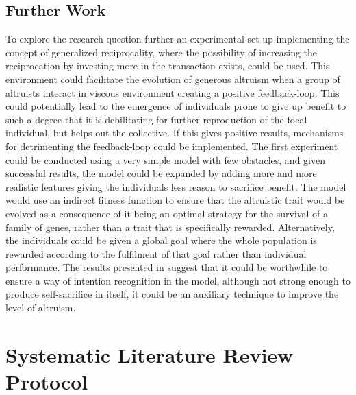 \documentclass[a4paper]{book}
\begin{document}
\section{Further Work}
To explore the research question further an experimental set up implementing the concept of generalized reciprocality, where the possibility of increasing the reciprocation by investing more in the transaction exists, could be used. 
This environment could facilitate the evolution of generous altruism when a group of altruists interact in viscous environment creating a positive feedback-loop. 
This could potentially lead to the emergence of individuals prone to give up benefit to such a degree that it is debilitating for further reproduction of the focal individual, but helps out the collective. 
If this gives positive results, mechanisms for detrimenting the feedback-loop could be implemented. 
The first experiment could be conducted using a very simple model with few obstacles, and given successful results, the model could be expanded by adding more and more realistic features giving the individuals less reason to sacrifice benefit. The model would use an indirect fitness function to ensure that the altruistic trait would be evolved as a consequence of it being an optimal strategy for the survival of a family of genes, rather than a trait that is specifically rewarded. Alternatively, the individuals could be given a global goal where the whole population is rewarded according to the fulfilment of that goal rather than individual performance. 
The results presented in \cite{han_role_2011} suggest that it could be worthwhile to ensure a way of intention recognition in the model, although not strong enough to produce self-sacrifice in itself, it could be an auxiliary technique to improve the level of altruism.


\chapter{Systematic Literature Review Protocol}\label{T-B}
\label{cha:STL}

\end{document}
